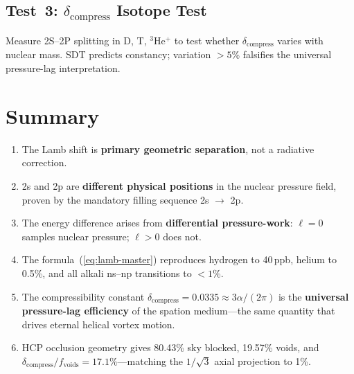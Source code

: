 \subsection{Test~3: $\delta_{\text{compress}}$ Isotope Test}

Measure 2S--2P splitting in D, T, ${}^3$He$^+$ to test whether $\delta_{\text{compress}}$ varies with nuclear mass.  SDT predicts constancy; variation $>5$\% falsifies the universal pressure-lag interpretation.


\section{Summary}

\begin{enumerate}
  \item The Lamb shift is \textbf{primary geometric separation}, not a radiative correction.
  \item 2s and 2p are \textbf{different physical positions} in the nuclear pressure field, proven by the mandatory filling sequence 2s $\to$ 2p.
  \item The energy difference arises from \textbf{differential pressure-work}: $\ell = 0$ samples nuclear pressure; $\ell > 0$ does not.
  \item The formula~(\ref{eq:lamb-master}) reproduces hydrogen to 40\,ppb, helium to 0.5\%, and all alkali ns--np transitions to $<1$\%.
  \item The compressibility constant $\delta_{\text{compress}} = 0.0335 \approx 3\alpha/(2\pi)$ is the \textbf{universal pressure-lag efficiency} of the spation medium---the same quantity that drives eternal helical vortex motion.
  \item HCP occlusion geometry gives 80.43\% sky blocked, 19.57\% voids, and $\delta_{\text{compress}}/f_{\text{voids}} = 17.1\%$---matching the $1/\sqrt{3}$ axial projection to 1\%.
\end{enumerate}


